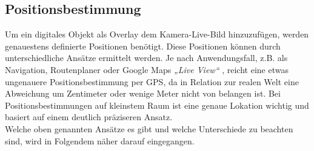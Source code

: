 \subsection{Positionsbestimmung}
\label{sec:posi}
Um ein digitales Objekt als Overlay dem Kamera-Live-Bild hinzuzufügen, werden genauestens definierte Positionen benötigt. Diese Positionen 
können durch unterschiedliche Ansätze ermittelt werden. Je nach Anwendungsfall, z.B. als Navigation, Routenplaner oder Google Maps 
\textit{„Live View“} \cite{googleliveview.2019a}, reicht eine etwas ungenauere Positionsbestimmung per \acs{GPS}, da in Relation zur 
realen Welt eine Abweichung um Zentimeter oder wenige Meter nicht von belangen ist. Bei Positionsbestimmungen auf kleinstem Raum ist eine 
genaue Lokation wichtig und basiert auf einem deutlich präziseren Ansatz. 
\\ 
Welche oben genannten Ansätze es gibt und welche Unterschiede zu beachten sind, wird in Folgendem näher darauf eingegangen. 
